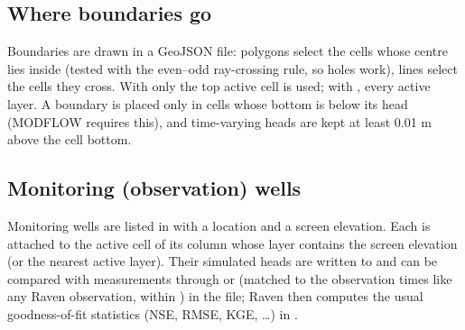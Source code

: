 \subsection{Where boundaries go}
Boundaries are drawn in a GeoJSON file: polygons select the cells whose centre lies inside (tested with the even--odd
ray-crossing rule, so holes work), lines select the cells they cross. With  only the top active cell
is used; with , every active layer. A boundary is placed only in cells whose bottom is below its head
(MODFLOW requires this), and time-varying heads are kept at least 0.01 m above the cell bottom.

\subsection{Monitoring (observation) wells}
Monitoring wells are listed in  with a location and a screen elevation. Each is attached to the
active cell of its column whose layer contains the screen elevation (or the nearest active layer). Their simulated heads
are written to  and can be compared with measurements through  or
 (matched to the observation times like any Raven observation, within ) in the
 file; Raven then computes the usual goodness-of-fit statistics (NSE, RMSE, KGE, \dots) in .

